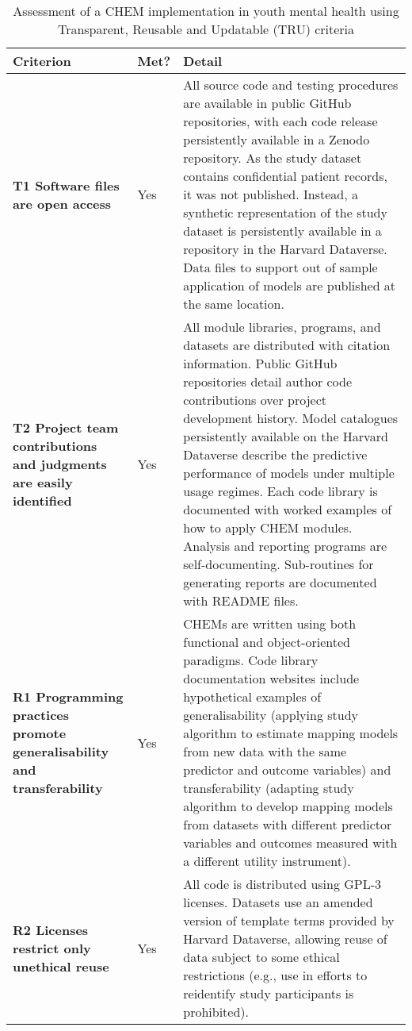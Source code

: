 \documentclass[sn-vancouver,Numbered,pdflatex]{sn-jnl}
\theoremstyle{remark}
\theoremstyle{definition}
\begin{document}
\begin{table}

\caption{\label{tab:checktb}Assessment of a CHEM implementation in youth mental health using Transparent, Reusable and Updatable (TRU) criteria}
\centering
\begin{tabular}[t]{>{\raggedright\arraybackslash}p{10em}l>{\raggedright\arraybackslash}p{35em}}
\toprule
Criterion & Met? & Detail\\
\midrule
\textbf{T1 Software files are open access} & Yes & All source code and testing procedures are available in public GitHub repositories, with each code release persistently available in a Zenodo repository. As the study dataset contains confidential patient records, it was not published. Instead, a synthetic representation of the study dataset is persistently available in a repository in the Harvard Dataverse. Data files to support out of sample application of models are published at the same location.\\
\textbf{T2 Project team contributions and judgments are easily identified} & Yes & All module libraries, programs, and datasets are distributed with citation information. Public GitHub repositories detail author code contributions over project development history. Model catalogues persistently available on the Harvard Dataverse describe the predictive performance of models under multiple usage regimes. Each code library is documented with worked examples of how to apply CHEM modules.  Analysis and reporting programs are self-documenting.  Sub-routines for generating reports are documented with README files.\\
\textbf{R1 Programming practices promote generalisability and transferability} & Yes & CHEMs are written using both functional and object-oriented paradigms. Code library documentation websites include hypothetical examples of generalisability (applying study algorithm to estimate mapping models from new data with the same predictor and outcome variables) and transferability (adapting study algorithm to develop mapping models from datasets with different predictor variables and outcomes measured with a different utility instrument).\\
\textbf{R2 Licenses restrict only unethical reuse} & Yes & All code is distributed using GPL-3 licenses. Datasets use an amended version of template terms provided by Harvard Dataverse, allowing reuse of data subject to some ethical restrictions (e.g., use in efforts to reidentify study participants is prohibited).\\

\end{tabular}
\end{table}
\end{document}
